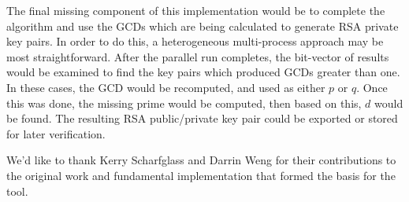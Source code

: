 \documentclass[smallextended]{svjour3}       %
\begin{document}
The final missing component of this implementation would be to complete the 
algorithm and use the GCDs which are being calculated to generate RSA private 
key pairs. In order to do this, a heterogeneous multi-process approach may be 
most straightforward. After the parallel run completes, the bit-vector of 
results would be examined to find the key pairs which produced GCDs greater 
than one. In these cases, the GCD would be recomputed, and used as either $p$ 
or $q$. Once this was done, the missing prime would be computed, then based on 
this, $d$ would be found. The resulting RSA public/private key pair could be 
exported or stored for later verification.


\begin{acknowledgements}
We'd like to thank Kerry Scharfglass and Darrin Weng for their contributions
to the original work and fundamental implementation that formed the basis for
the tool.
\end{acknowledgements}

\end{document}
